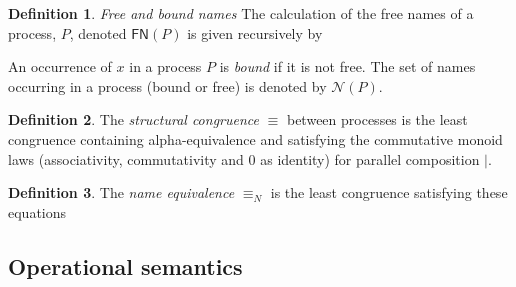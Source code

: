 \documentclass[submission,copyright,creativecommons]{eptcs}
\makeatletter
\newcommand{\pzero}{\mathbin{0}}
\newcommand{\scong}{\mathbin{\equiv}}
\newcommand{\nameeq}{\mathbin{\equiv_N}}
\newcommand{\names}[1]{\mathbin{\mathcal{N}(#1)}}
\newcommand{\freenames}[1]{\mathbin{\mathsf{FN}(#1)}}
\newcommand{\quotep}[1]{\mathsf{@}#1}
\newcommand{\dropn}[1]{\mathsf{*}#1}
\newcommand{\substn}[2]{\{ #1 / #2 \}}
\newcommand{\bc}{\mathbin{\mathbf{::=}}}
\newcommand{\bm}{\mathbin{\mathbf\mid}}
\newcommand{\red}{\rightarrow}
\theoremstyle{definition}
\newtheorem{definition}{Definition}
\theoremstyle{remark}
\theoremstyle{remark}
\makeatother
\begin{document}

\begin{definition}
\emph{Free and bound names} The calculation of the free names of a
process, $P$, denoted $\freenames{P}$ is given recursively by


An occurrence of $x$ in a process $P$ is \textit{bound} if it is not
free. The set of names occurring in a process (bound or free) is
denoted by $\names{P}$.
\end{definition}

\begin{definition}
  The {\em structural congruence} $\equiv$
  between processes \cite{SangiorgiWalker} is the least congruence containing
  alpha-equivalence and satisfying the commutative monoid laws
  (associativity, commutativity and $\pzero$ as identity) for parallel
  composition $|$.
\end{definition}

\begin{definition}
  The {\em name equivalence} $\nameeq$ is the least congruence
  satisfying these equations
\end{definition}

\subsection{Operational semantics} 

\end{document}
